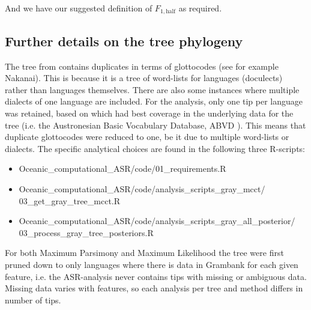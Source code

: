\documentclass[12pt,letterpaper]{article}
\begin{document}
\noindent And we have our suggested definition of $F_{1,\text{half}}$ as required.

\FloatBarrier


%


\subsection{Further details on the tree phylogeny}
\label{supp:tree_details}

The tree from \citet{grayetal_2009} contains duplicates in terms of glottocodes (see for example Nakanai). This is because it is a tree of word-lists for languages (doculects) rather than languages themselves. There are also some instances where multiple dialects of one language are included. For the analysis, only one tip per language was retained, based on which had best coverage in the underlying data for the tree (i.e. the Austronesian Basic Vocabulary Database, ABVD \citep{ABVD}). This means that duplicate glottocodes were reduced to one, be it due to multiple word-lists or dialects. The specific analytical choices are found in the following three R-scripts:

\begin{itemize}
\item Oceanic\_computational\_ASR/code/01\_requirements.R
\item Oceanic\_computational\_ASR/code/analysis\_scripts\_gray\_mcct/\\03\_get\_gray\_tree\_mcct.R
\item Oceanic\_computational\_ASR/code/analysis\_scripts\_gray\_all\_posterior/\\03\_process\_gray\_tree\_posteriors.R
\end{itemize}

For both Maximum Parsimony and Maximum Likelihood the tree were first pruned down to only languages where there is data in Grambank for each given feature, i.e. the ASR-analysis never contains tips with missing or ambiguous data. Missing data varies with features, so each analysis per tree and method differs in number of tips.

\end{document}
